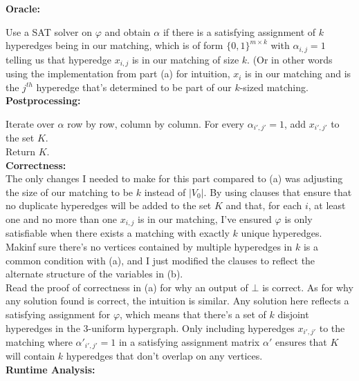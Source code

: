 \documentclass[11pt]{article}
\begin{document}
\begin{enumerate}
\begin{enumerate}
\textbf{Oracle: }

Use a SAT solver on $\varphi$ and obtain $\alpha$ if there is a satisfying assignment of $k$ hyperedges being in our matching, which is of form $\{0,1\}^{m \times k}$ with $\alpha_{i,j} = 1$ telling us that hyperedge $x_{i,j}$ is in our matching of size $k$. (Or in other words using the implementation from part (a) for intuition, $x_i$ is in our matching and is the $j^{th}$ hyperedge that's determined to be part of our $k$-sized matching. \\

\textbf{Postprocessing: }

Iterate over $\alpha$ row by row, column by column. For every $\alpha_{i',j'} = 1$, add $x_{i',j'}$ to the set $K$. \\

Return $K$. \\

\textbf{Correctness: } \\

The only changes I needed to make for this part compared to (a) was adjusting the size of our matching to be $k$ instead of $|V_0|$. By using clauses that ensure that no duplicate hyperedges will be added to the set $K$ and that, for each $i$, at least one and no more than one $x_{i,j}$ is in our matching, I've ensured $\varphi$ is only satisfiable when there exists a matching with exactly $k$ unique hyperedges. Makinf sure there's no vertices contained by multiple hyperedges in $k$ is a common condition with (a), and I just modified the clauses to reflect the alternate structure of the variables in (b). \\

Read the proof of correctness in (a) for why an output of $\bot$ is correct. As for why any solution found is correct, the intuition is similar. Any solution here reflects a satisfying assignment for $\varphi$, which means that there's a set of $k$ disjoint hyperedges in the 3-uniform hypergraph. Only including hyperedges $x_{i',j'}$ to the matching where $\alpha'_{i',j'} = 1$ in a satisfying assignment matrix $\alpha'$ ensures that $K$ will contain $k$ hyperedges that don't overlap on any vertices. \\

\textbf{Runtime Analysis: } \\


\end{enumerate}
\end{enumerate}
\end{document}
